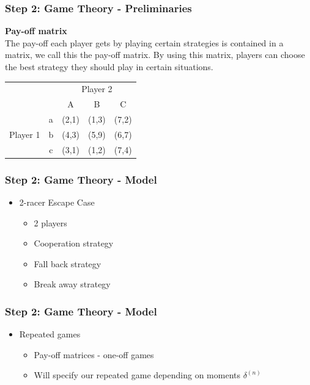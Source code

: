 \documentclass{beamer}
\begin{document}
\begin{frame}
\frametitle{Step 2: Game Theory - Preliminaries}

\textbf{Pay-off matrix}\\
The pay-off each player gets by playing certain strategies is contained in a matrix, we call this the pay-off matrix. By using this matrix, players can choose the best strategy they should play in certain situations.

\begin{example}
\begin{table}[ht!]
	\hspace{-4em}
	\centering
	\begin{tabular}{ccccc|}
		& & \multicolumn{3}{c}{Player 2}                                \\ \cline{3-5}
		& & A & B & \multicolumn{1}{c}{C}                               \\ \cline{3-5}
		\multirow{3}{*}{Player 1} & \multicolumn{1}{|c|}{a} & (2,1) & (1,3) & (7,2) \\
		& \multicolumn{1}{|c|}{b} & (4,3) & (5,9) & (6,7)                           \\
		& \multicolumn{1}{|c|}{c} & (3,1) & (1,2) & (7,4)                           \\ \cline{3-5}
	\end{tabular}
\end{table}
\end{example}

\end{frame}

\begin{frame}
\frametitle{Step 2: Game Theory - Model}
\begin{itemize}
\item 2-racer Escape Case
	\begin{itemize}
		\item 2 players
		\item Cooperation strategy
		\item Fall back strategy
		\item Break away strategy
	\end{itemize}
\end{itemize}
\end{frame}

\begin{frame}
\frametitle{Step 2: Game Theory - Model}
\begin{itemize}
\item Repeated games
	\begin{itemize}
		\item Pay-off matrices - one-off games
		\item Will specify our repeated game depending on moments $\delta^{(n)}$
	\end{itemize}
\end{itemize}
\end{frame}
\end{document}
